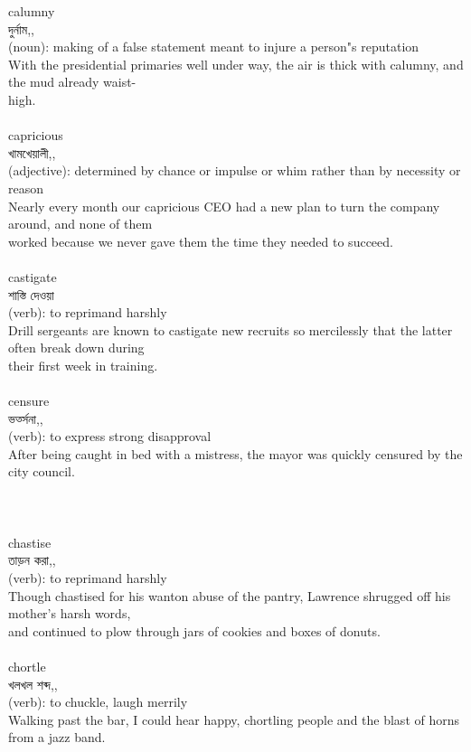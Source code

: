 \documentclass{article}
\begin{document}
{calumny}\\
{দুর্নাম,,}\\
{(noun): making of a false statement meant to injure a person"s reputation\\With the presidential primaries well under way, the air is thick with calumny, and the mud already waist-\\high.\\}\\
{capricious}\\
{খামখেয়ালী,,}\\
{(adjective): determined by chance or impulse or whim rather than by necessity or reason\\Nearly every month our capricious CEO had a new plan to turn the company around, and none of them\\worked because we never gave them the time they needed to succeed.\\}\\
{castigate}\\
{শাস্তি দেওয়া}\\
{(verb): to reprimand harshly\\Drill sergeants are known to castigate new recruits so mercilessly that the latter often break down during\\their first week in training.\\}\\
{censure}\\
{ভর্ত্সনা,,}\\
{(verb): to express strong disapproval\\After being caught in bed with a mistress, the mayor was quickly censured by the city council.\\\\                                                                               \\}\\
{chastise}\\
{তাড়ন করা,,}\\
{(verb): to reprimand harshly\\Though chastised for his wanton abuse of the pantry, Lawrence shrugged off his mother's harsh words,\\and continued to plow through jars of cookies and boxes of donuts.\\}\\
{chortle}\\
{খলখল শব্দ,,}\\
{(verb): to chuckle, laugh merrily\\Walking past the bar, I could hear happy, chortling people and the blast of horns from a jazz band.\\}\\
\end{document}
